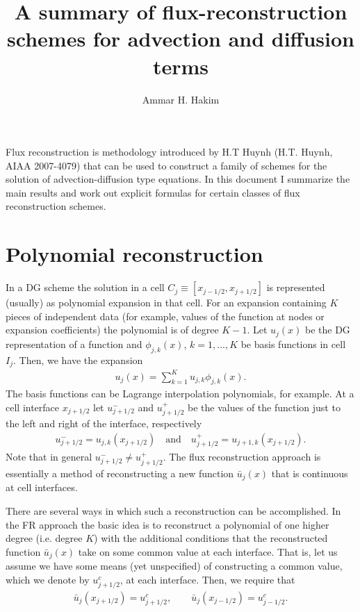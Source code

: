 \documentclass[11pt, reqno]{amsart}
\title[Flux Reconstruction]{A summary of flux-reconstruction schemes
  for advection and diffusion terms}%
\author{Ammar H. Hakim}%
\date{}%
\theoremstyle{definition}
\begin{document}
%
\maketitle

Flux reconstruction is methodology introduced by H.T Huynh
(H.T. Huynh, AIAA 2007-4079) that can be used to construct a family of
schemes for the solution of advection-diffusion type equations. In
this document I summarize the main results and work out explicit
formulas for certain classes of flux reconstruction schemes.

\section{Polynomial reconstruction}

In a DG scheme the solution in a cell $C_j\equiv
[x_{j-1/2},x_{j+1/2}]$ is represented (usually) as polynomial
expansion in that cell. For an expansion containing $K$ pieces of
independent data (for example, values of the function at nodes or
expansion coefficients) the polynomial is of degree $K-1$. Let
$u_j(x)$ be the DG representation of a function and $\phi_{j,k}(x)$,
$k=1,\ldots,K$ be basis functions in cell $I_j$. Then, we have the
expansion
\begin{align}
  u_j(x) = \sum_{k=1}^K u_{j,k} \phi_{j,k}(x).
\end{align}
The basis functions can be Lagrange interpolation polynomials, for
example. At a cell interface $x_{j+1/2}$ let $u^-_{j+1/2}$ and
$u^+_{j+1/2}$ be the values of the function just to the left and right
of the interface, respectively
\begin{align}
  u_{j+1/2}^- = u_{j,k}(x_{j+1/2}) \quad\mathrm{and}\quad
  u_{j+1/2}^+ = u_{j+1,k}(x_{j+1/2}).
\end{align}
Note that in general $u^-_{j+1/2}\ne u^+_{j+1/2}$. The flux
reconstruction approach is essentially a method of reconstructing a
new function $\bar{u}_j(x)$ that is continuous at cell
interfaces. 

There are several ways in which such a reconstruction can be
accomplished. In the FR approach the basic idea is to reconstruct a
polynomial of one higher degree (i.e. degree $K$) with the additional
conditions that the reconstructed function $\bar{u}_j(x)$ take on some
common value at each interface. That is, let us assume we have some
means (yet unspecified) of constructing a common value, which we
denote by $u_{j+1/2}^c$, at each interface. Then, we require that
\begin{align}
  \bar{u}_{j}(x_{j+1/2}) = u_{j+1/2}^c, \quad\quad
  \bar{u}_{j}(x_{j-1/2}) = u_{j-1/2}^c.
\end{align}
\end{document}
